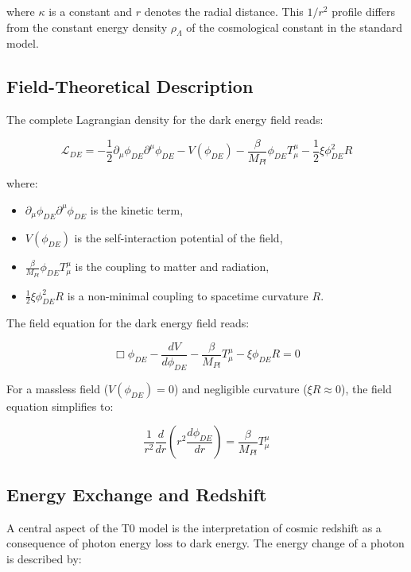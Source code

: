 \documentclass[a4paper,12pt]{article}
\begin{document}
	where $\kappa$ is a constant and $r$ denotes the radial distance. This $1/r^2$ profile differs from the constant energy density $\rho_\Lambda$ of the cosmological constant in the standard model.
	
	\subsection{Field-Theoretical Description}
	
	The complete Lagrangian density for the dark energy field reads:
	
	\begin{equation}
		\mathcal{L}_{DE} = -\frac{1}{2}\partial_\mu \phi_{DE} \partial^\mu \phi_{DE} - V(\phi_{DE}) - \frac{\beta}{M_{Pl}} \phi_{DE} T^{\mu}_{\mu} - \frac{1}{2}\xi \phi_{DE}^2 R
	\end{equation}
	
	where:
	\begin{itemize}
		\item $\partial_\mu \phi_{DE} \partial^\mu \phi_{DE}$ is the kinetic term,
		\item $V(\phi_{DE})$ is the self-interaction potential of the field,
		\item $\frac{\beta}{M_{Pl}} \phi_{DE} T^{\mu}_{\mu}$ is the coupling to matter and radiation,
		\item $\frac{1}{2}\xi \phi_{DE}^2 R$ is a non-minimal coupling to spacetime curvature $R$.
	\end{itemize}
	
	The field equation for the dark energy field reads:
	
	\begin{equation}
		\Box\phi_{DE} - \frac{dV}{d\phi_{DE}} - \frac{\beta}{M_{Pl}}T^{\mu}_{\mu} - \xi \phi_{DE} R = 0
	\end{equation}
	
	For a massless field ($V(\phi_{DE}) = 0$) and negligible curvature ($\xi R \approx 0$), the field equation simplifies to:
	
	\begin{equation}
		\frac{1}{r^2}\frac{d}{dr}\left(r^2\frac{d\phi_{DE}}{dr}\right) = \frac{\beta}{M_{Pl}}T^{\mu}_{\mu}
	\end{equation}
	
	\subsection{Energy Exchange and Redshift}
	
	A central aspect of the T0 model is the interpretation of cosmic redshift as a consequence of photon energy loss to dark energy. The energy change of a photon is described by:
	
\end{document}

